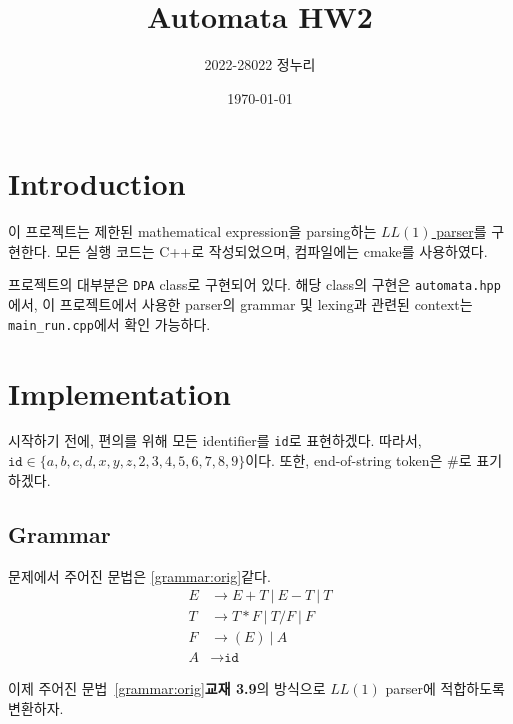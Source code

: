 \documentclass[a4paper,10pt]{scrartcl}
\title{\vspace{-0.5in}Automata HW2}
\author{\vspace{-15pt}2022-28022 정누리}
\date{\vspace{-5pt}\today}
\numberwithin{equation}{section}
\numberwithin{figure}{section}
\numberwithin{table}{section}
\theoremstyle{definition}
\begin{document}
\maketitle

\section{Introduction}

이 프로젝트는 제한된 mathematical expression을 parsing하는 \hyperref[subsec:ll1]{$LL(1)$ parser}를 구현한다. 모든 실행 코드는 C++로 작성되었으며, 컴파일에는 cmake를 사용하였다.

프로젝트의 대부분은 \lstinline{DPA} class로 구현되어 있다. 해당 class의 구현은 \lstinline{automata.hpp}에서, 이 프로젝트에서 사용한 parser의 grammar 및 lexing과 관련된 context는 \lstinline{main_run.cpp}에서 확인 가능하다.

\section{Implementation}

시작하기 전에, 편의를 위해 모든 identifier를 \texttt{id}로 표현하겠다. 따라서, $\texttt{id} \in \{ a, b, c, d, x, y, z, 2, 3, 4, 5, 6, 7, 8, 9 \}$이다. 또한, end-of-string token은 $\#$로 표기하겠다.

\subsection{Grammar}

문제에서 주어진 문법은 \ref{grammar:orig}\와 같다.
\begin{equation}\label{grammar:orig}
  \begin{aligned}
    E & \to E+T\ |\ E-T\ |\ T \\
    T & \to T*F\ |\ T/F\ |\ F \\
    F & \to (E)\ |\ A         \\
    A & \to \texttt{id}
  \end{aligned}
\end{equation}

이제 주어진 문법~\ref{grammar:orig}\을 \textbf{교재 3.9}의 방식으로 $LL(1)$ parser에 적합하도록 변환하자.
\end{document}
